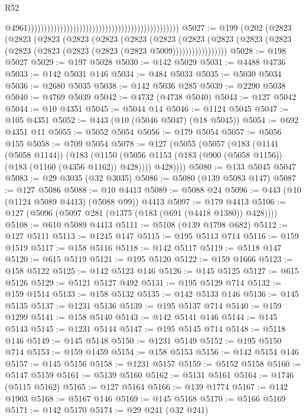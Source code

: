 \begin{lexlean}{R52}
\begin{coremodule}
{{{{{{{{{{{{{{{{{{{{{{{{{{{{{{{{{{{{{{{{{{{{{{{{{{{{{{{{{{{{{{{{{{{{{{{{{{{{{{{{{{{{{{{{{{{{{{{{{{{{{{{{{{{{{{{{{{{{{{{{{{{{{{{{{{{{{{{{{{{{{{{{{{{{{{{{{{{{{{{{{{{{{{{{{{{{{{{{{{{{{{{{{{{{{{{{{{{{{{                                                                                                  @4961)))))))))))))))))))))))))))))))))))))))))))))))
@5027 := @199
    (@202
      (@2823
        (@2823
          (@2823
            (@2823
              (@2823
                (@2823
                  (@2823
                    (@2823
                      (@2823 (@2823 (@2823 (@2823 (@2823 (@2823 (@2823 (@2823 @5009)))))))))))))))))
@5028 := @198 @5027
@5029 := @197 @5028
@5030 := @142 @5029
@5031 := @4488 @4736
@5033 := @142 @5031 @146
@5034 := @484 @5033
@5035 := @5030 @5034
@5036 := @2680 @5035
@5038 := @142 @5036 @285
@5039 := @2290 @5038
@5040 := @4769 @5039
@5042 := @4732 (@4738 @5040)
@5043 := @127 @5042
@5044 := @10 @4351
@5045 := @5044 @14
@5046 := @1124 @5045
@5047 := @105 @4351
@5052 := @443 (@10 (@5046 @5047) (@18 @5045))
@5054 := @692 @4351 @11
@5055 := @5052 @5054
@5056 := @179 @5054
@5057 := @5056 @155
@5058 := @709 @5054
@5078 := @127
    (@5055
      (@5057
        (@183
          (@1141 (@5058 @1144))
          (@183
            (@1150 (@5056 @1153 (@183 (@900 (@5058 @1156)) (@183 (@1160 (@4356 @1162)) @428))))
            @428))))
@5080 := @133 @5045 @5047
@5083 := @29 @3035 (@32 @3035)
@5086 := @5080 (@139 @5083 @147)
@5087 := @127 @5086
@5088 := @10 @4413
@5089 := @5088 @24
@5096 := @443 (@10 (@1124 @5089 @4413) (@5088 @99)) @4413
@5097 := @179 @4413
@5106 := @127 (@5096 (@5097 @281 (@1375 (@183 (@691 (@4418 @1380)) @428))))
@5108 := @610 @5089 @4413
@5111 := @5108 (@139 @1798 @682)
@5112 := @127 @5111
@5113 := @1245 @147
@5115 := @195 @5113 @714
@5116 := @159 @1519
@5117 := @158 @5116
@5118 := @142 @5117
@5119 := @5118 @147
@5120 := @615 @5119
@5121 := @195 @5120
@5122 := @159 @1666
@5123 := @158 @5122
@5125 := @142 @5123 @146
@5126 := @145 @5125
@5127 := @615 @5126
@5129 := @5121 @5127 @492
@5131 := @195 @5129 @714
@5132 := @159 @1514
@5133 := @158 @5132
@5135 := @142 @5133 @146
@5136 := @145 @5135
@5137 := @1231 @5136
@5139 := @195 @5137 @714
@5140 := @159 @1299
@5141 := @158 @5140
@5143 := @142 @5141 @146
@5144 := @145 @5143
@5145 := @1231 @5144
@5147 := @195 @5145 @714
@5148 := @5118 @146
@5149 := @145 @5148
@5150 := @1231 @5149
@5152 := @195 @5150 @714
@5153 := @159 @1459
@5154 := @158 @5153
@5156 := @142 @5154 @146
@5157 := @145 @5156
@5158 := @1231 @5157
@5159 := @5152 @5158
@5160 := @5147 @5159
@5161 := @5139 @5160
@5162 := @5131 @5161
@5164 := @1746 (@5115 @5162)
@5165 := @127 @5164
@5166 := @139 @1774
@5167 := @142 @1903
@5168 := @5167 @146
@5169 := @145 @5168
@5170 := @5166 @5169
@5171 := @142 @5170
@5174 := @29 @241 (@32 @241)
}}}}}}}}}}}}}}}}}}}}}}}}}}}}}}}}}}}}}}}}}}}}}}}}}}}}}}}}}}}}}}}}}}}}}}}}}}}}}}}}}}}}}}}}}}}}}}}}}}}}}}}}}}}}}}}}}}}}}}}}}}}}}}}}}}}}}}}}}}}}}}}}}}}}}}}}}}}}}}}}}}}}}}}}}}}}}}}}}}}}}}}}}}}}}}}}}}}}}}
\end{coremodule}
\end{lexlean}

